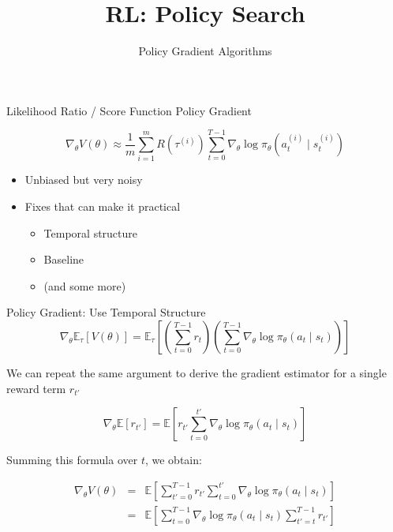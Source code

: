 \documentclass[aspectratio=169]{../latex_main/tntbeamer}  %
\title[RL: Policy Gradient]{RL: Policy Search}
\subtitle{Policy Gradient Algorithms}
\begin{document}
	
	\maketitle

\begin{frame}[c]{Likelihood Ratio / Score Function Policy Gradient}
	
	
	$$\nabla_\theta V(\theta) \approx \frac{1}{m} \sum_{i=1}^{m} R(\tau^{(i)}) \sum_{t=0}^{T-1} \nabla_\theta \log \pi_\theta (a_t^{(i)} \mid s_t^{(i)}) $$
	
	\begin{itemize}
		\item Unbiased but very noisy
		\item Fixes that can make it practical
		\begin{itemize}
			\item Temporal structure
			\item Baseline
			\item (and some more)
		\end{itemize}
		
	\end{itemize}
	
\end{frame}
\begin{frame}[c]{Policy Gradient: Use Temporal Structure}
\vspace{-1.5em}
$$ \nabla_\theta \mathbb{E}_\tau [V(\theta)] = \mathbb{E}_\tau \left[ \left(\sum_{t=0}^{T-1} r_t\right) \left( \sum_{t=0}^{T-1} \nabla_\theta \log \pi_\theta(a_t \mid s_t) \right) \right]$$
	
We can repeat the same argument to derive the gradient estimator for a single reward term $r_{t'}$

$$\nabla_\theta \mathbb{E} [r_{t'}] = \mathbb{E} \left[r_{t'} \sum_{t=0}^{t'} \nabla_\theta \log \pi_\theta (a_t \mid s_t)\right] $$
	
Summing this formula over $t$, we obtain:

\begin{eqnarray}
\nabla_\theta V(\theta) &=& \mathbb{E} \left[ \sum_{t'=0}^{T-1} r_{t'} \sum^{t'}_{t=0} \nabla_\theta \log \pi_\theta (a_t \mid s_t)  \right]\nonumber\\
&=& \mathbb{E} \left[ \sum_{t=0}^{T-1}  \nabla_\theta \log \pi_\theta (a_t \mid s_t)   \sum^{T-1}_{t'=t} r_{t'}  \right]\nonumber
\end{eqnarray}

	
\end{frame}
\end{document}
